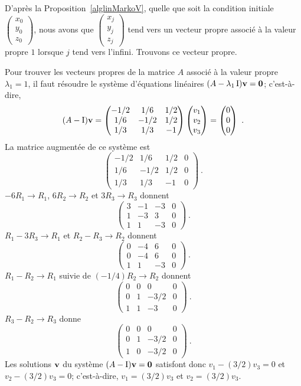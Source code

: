 {D'après la Proposition~\ref{alglinMarkoV}, quelle que soit la
condition initiale
$\displaystyle \begin{pmatrix} x_0 \\ y_0 \\ z_0 \end{pmatrix}$, nous avons que
$\displaystyle \begin{pmatrix} x_j \\ y_j \\ z_j \end{pmatrix}$ tend vers
un vecteur propre associé à la valeur propre $1$ lorsque $j$ tend vers
l'infini.  Trouvons ce vecteur propre.

Pour trouver les vecteurs propres de la matrice $A$ associé à la valeur
propre $\lambda_1=1$, il faut résoudre le système d'équations linéaires
$(A-\lambda_1 \operatorname{I}) \mathbf{v} = \mathbf{0}$; c'est-à-dire,
\[
(A-\operatorname{I})\mathbf{v}
= \begin{pmatrix}
-1/2 & 1/6 & 1/2 \\
1/6 & -1/2 & 1/2 \\
1/3 & 1/3 & -1
\end{pmatrix}
\begin{pmatrix} v_1 \\ v_2 \\ v_3  \end{pmatrix} =
\begin{pmatrix} 0 \\ 0 \\ 0 \end{pmatrix}\ .
\]
La matrice augmentée de ce système est
\[
\left(\begin{array}{rrr|r}
-1/2 & 1/6 & 1/2 & 0 \\
1/6 & -1/2 & 1/2 & 0 \\
1/3 & 1/3 & -1 & 0
\end{array}\right) \ .
\]
$-6R_1 \to R_1$, $6R_2 \to R_2$ et $3R_3 \to R_3$ donnent
\[
\left(\begin{array}{rrr|r}
3 & -1 & -3 & 0 \\
1 & -3 & 3 & 0 \\
1 & 1 & -3 & 0
\end{array}\right) \ .
\]
$R_1 - 3R_3 \to R_1$ et $R_2-R_3 \to R_2$ donnent
\[
\left(\begin{array}{rrr|r}
0 & -4 & 6 & 0 \\
0 & -4 & 6 & 0 \\
1 & 1 & -3 & 0
\end{array}\right) \ .
\]
$R_1 - R_2 \to R_1$ suivie de $(-1/4)R_2 \to R_2$ donnent
\[
\left(\begin{array}{rrr|r}
0 & 0 & 0 & 0 \\
0 & 1 & -3/2 & 0 \\
1 & 1 & -3 & 0
\end{array}\right) \ .
\]
$R_3 - R_2 \to R_3$ donne
\[
\left(\begin{array}{rrr|r}
0 & 0 & 0 & 0 \\
0 & 1 & -3/2 & 0 \\
1 & 0 & -3/2 & 0
\end{array}\right) \ .
\]
Les solutions $\mathbf{v}$ du système $(A-\operatorname{I}) \mathbf{v} = \mathbf{0}$ satisfont
donc $v_1 - (3/2) v_3 = 0$ et $v_2 - (3/2) v_3 = 0$;
c'est-à-dire, $v_1=(3/2)v_3$ et $v_2 = (3/2) v_3$.

}
